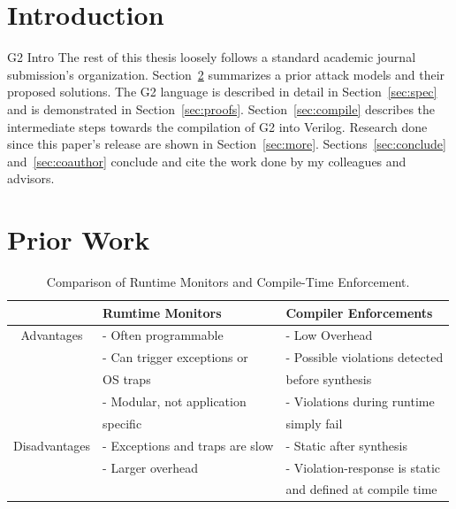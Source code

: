\documentclass[sigconf,usenames,dvipsnames,svgnames,table]{acmart}
\def \sysname {\textsc{G2}\xspace}
\begin{document}

\maketitle
  \section{Introduction}\label{sec:intro}
    \sysname Intro
    \cite{2011gem5sim}
    \cite{2019stt}
    The rest of this thesis loosely follows a standard academic journal submission's organization.
    Section~\ref{sec:priorwork} summarizes a prior attack models and their proposed solutions.
    The \sysname language is described in detail in Section~\ref{sec:spec} and is demonstrated in Section~\ref{sec:proofs}.
    Section~\ref{sec:compile} describes the intermediate steps towards the compilation of \sysname into Verilog.
    Research done since this paper's release are shown in Section~\ref{sec:more}.
    Sections~\ref{sec:conclude} and~\ref{sec:coauthor} conclude and cite the work done by my colleagues and advisors.

  \section{Prior Work}\label{sec:priorwork}
    \begin{table}
      \centering
      \begin{tabular}{|c|l|l|} 
        \hline
          & Rumtime Monitors & Compiler Enforcements\\
        \hline
          Advantages
          & - Often programmable 
            & - Low Overhead \\
          & - Can trigger exceptions or
            & - Possible violations detected \\
          &\quad OS traps &\quad before synthesis \\ 
          & - Modular, not application  
            & - Violations during runtime \\
          &\quad specific &\quad simply fail \\
          \hline
          Disadvantages
          & - Exceptions and traps are slow 
            & - Static after synthesis \\
          & - Larger overhead 
            & - Violation-response is static \\
          & &\quad and defined at compile time \\
        \hline
      \end{tabular}
      \caption{Comparison of Runtime Monitors and Compile-Time Enforcement.}
      \label{table:prior:run-vs-comp}
    \end{table}
\end{document}
